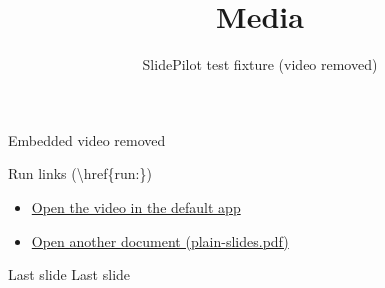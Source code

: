 \documentclass{beamer}
\title{Media}
\subtitle{SlidePilot test fixture (video removed)}
\begin{document}
\begin{frame}
  \titlepage
\end{frame}

\begin{frame}{Embedded video removed}
  \centering
\end{frame}

\begin{frame}{Run links (\textbackslash href\{run:\})}
  \begin{itemize}
    \item \href{run:media/test-pattern.mp4}{Open the video in the default app}
    \item \href{run:plain-slides.pdf}{Open another document (plain-slides.pdf)}
  \end{itemize}
\end{frame}

\begin{frame}{Last slide}
  \centering
  \Large Last slide
\end{frame}
\end{document}
